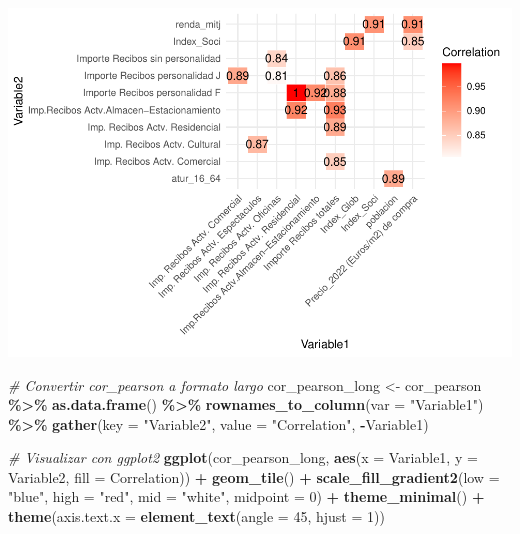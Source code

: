 \documentclass[notspecified,article,submit,moreauthors,pdftex]{Definitions/mdpi}
\newenvironment{Shaded}{\begin{snugshade}}{\end{snugshade}}
\newcommand{\AttributeTok}[1]{\textcolor[rgb]{0.13,0.29,0.53}{#1}}
\newcommand{\CommentTok}[1]{\textcolor[rgb]{0.56,0.35,0.01}{\textit{#1}}}
\newcommand{\DecValTok}[1]{\textcolor[rgb]{0.00,0.00,0.81}{#1}}
\newcommand{\FunctionTok}[1]{\textcolor[rgb]{0.13,0.29,0.53}{\textbf{#1}}}
\newcommand{\NormalTok}[1]{#1}
\newcommand{\OtherTok}[1]{\textcolor[rgb]{0.56,0.35,0.01}{#1}}
\newcommand{\SpecialCharTok}[1]{\textcolor[rgb]{0.81,0.36,0.00}{\textbf{#1}}}
\newcommand{\StringTok}[1]{\textcolor[rgb]{0.31,0.60,0.02}{#1}}
\begin{document}
\begin{center}\includegraphics{./figure/unnamed-chunk-18-1} \end{center}

\begin{Shaded}
\begin{Highlighting}[]
\CommentTok{\# Convertir cor\_pearson a formato largo}
\NormalTok{cor\_pearson\_long }\OtherTok{\textless{}{-}}\NormalTok{ cor\_pearson }\SpecialCharTok{\%\textgreater{}\%} 
                    \FunctionTok{as.data.frame}\NormalTok{() }\SpecialCharTok{\%\textgreater{}\%} 
                    \FunctionTok{rownames\_to\_column}\NormalTok{(}\AttributeTok{var =} \StringTok{"Variable1"}\NormalTok{) }\SpecialCharTok{\%\textgreater{}\%} 
                    \FunctionTok{gather}\NormalTok{(}\AttributeTok{key =} \StringTok{"Variable2"}\NormalTok{, }\AttributeTok{value =} \StringTok{"Correlation"}\NormalTok{, }\SpecialCharTok{{-}}\NormalTok{Variable1)}

\CommentTok{\# Visualizar con ggplot2}
\FunctionTok{ggplot}\NormalTok{(cor\_pearson\_long, }\FunctionTok{aes}\NormalTok{(}\AttributeTok{x =}\NormalTok{ Variable1, }\AttributeTok{y =}\NormalTok{ Variable2, }\AttributeTok{fill =}\NormalTok{ Correlation)) }\SpecialCharTok{+}
    \FunctionTok{geom\_tile}\NormalTok{() }\SpecialCharTok{+}
    \FunctionTok{scale\_fill\_gradient2}\NormalTok{(}\AttributeTok{low =} \StringTok{"blue"}\NormalTok{, }\AttributeTok{high =} \StringTok{"red"}\NormalTok{, }\AttributeTok{mid =} \StringTok{"white"}\NormalTok{, }\AttributeTok{midpoint =} \DecValTok{0}\NormalTok{) }\SpecialCharTok{+}
    \FunctionTok{theme\_minimal}\NormalTok{() }\SpecialCharTok{+}
    \FunctionTok{theme}\NormalTok{(}\AttributeTok{axis.text.x =} \FunctionTok{element\_text}\NormalTok{(}\AttributeTok{angle =} \DecValTok{45}\NormalTok{, }\AttributeTok{hjust =} \DecValTok{1}\NormalTok{))}
\end{Highlighting}
\end{Shaded}
\end{document}
